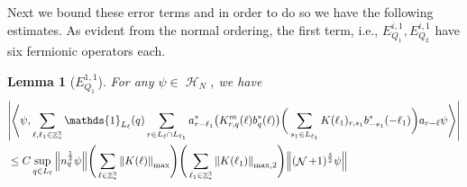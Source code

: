 \documentclass[sn-mathphys, Numbered ,a4paper]{sn-jnl}%
\DeclareMathOperator{\Z}{\mathbb{Z}}
\DeclareMathOperator{\HH}{\mathcal{H}}
\DeclareMathOperator{\NN}{\mathcal{N}}
\newcommand{\half}{\frac{1}{2}}
\newcommand{\eva}[1]{\left\langle #1 \right\rangle}
\theoremstyle{plain}
\newtheorem{lemma}[theorem]{Lemma}
\theoremstyle{definition}
\theoremstyle{remark}
\theoremstyle{plain}
\theoremstyle{definition}
\theoremstyle{remark}
\begin{document}
 Next we bound these error terms and in order to do so we have the following estimates. As evident from the normal ordering, the first term, i.e.,  $E_{Q_1}^{i,1}, E_{Q_2}^{i,1}$ have six fermionic operators each. %
\begin{lemma}[$E_{Q_1}^{1,1}$]
For any $\psi \in \HH_N$, we have
\begin{align}
     &\abs{\eva{\psi,\sum\limits_{\ell,\ell_1 \in \Z^3_*} \mathds{1}_{L_\ell}(q) \sum\limits_{r \in L_\ell \cap L_{\ell_1}}a^*_{r-\ell_1} 
     \big(K^{m}_{r,q}(\ell)b^*_{q}(\ell)\big) \bigg( \sum\limits_{s_1 \in L_{\ell_1}} K(\ell_1)_{r,s_1}b^*_{-s_1}(-\ell_1) \bigg) a_{r-\ell} \psi }}\nonumber\\
     &\leq  C \sup\limits_{q \in L_\ell} \norm{n_{q}^{\half} \psi} \Bigg(\sum\limits_{\ell \in \Z^3_*} \norm{K(\ell)}_{\mathrm{max}}\Bigg)\Bigg( \sum\limits_{\ell_1 \in \Z^3_*}\norm{K(\ell_1)}_{\mathrm{max},2} \Bigg)  \norm { (\NN+1)^{\frac{3}{2}} \psi } \label{eq:estEQ111}
\end{align}
\end{lemma}
\end{document}
